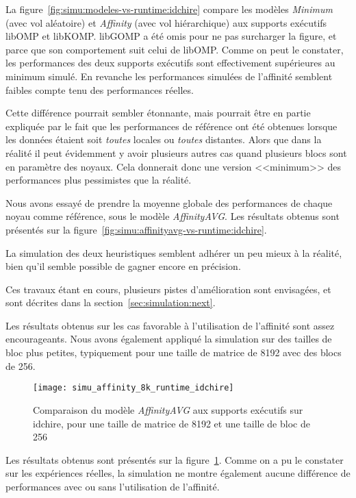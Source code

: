 La figure~\ref{fig:simu:modeles-vs-runtime:idchire} compare les modèles \emph{Minimum} (avec vol aléatoire) et \emph{Affinity} (avec vol hiérarchique) aux supports exécutifs libOMP et libKOMP. libGOMP a été omis pour ne pas surcharger la figure, et parce que son comportement suit celui de libOMP.
Comme on peut le constater, les performances des deux supports exécutifs sont effectivement supérieures au minimum simulé. En revanche les performances simulées de l'affinité semblent faibles compte tenu des performances réelles.

Cette différence pourrait sembler étonnante, mais pourrait être en partie expliquée par le fait que les performances de référence ont été obtenues lorsque les données étaient soit \textit{toutes} locales ou \textit{toutes} distantes.
Alors que dans la réalité il peut évidemment y avoir plusieurs autres cas quand plusieurs blocs sont en paramètre des noyaux.
Cela donnerait donc une version <<minimum>> des performances plus pessimistes que la réalité.

Nous avons essayé de prendre la moyenne globale des performances de chaque noyau comme référence, sous le modèle \emph{AffinityAVG}.
Les résultats obtenus sont présentés sur la figure~\ref{fig:simu:affinityavg-vs-runtime:idchire}.

La simulation des deux heuristiques semblent adhérer un peu mieux à la réalité, bien qu'il semble possible de gagner encore en précision.

Ces travaux étant en cours, plusieurs pistes d'amélioration sont envisagées, et sont décrites dans la section~\ref{sec:simulation:next}.


Les résultats obtenus sur les cas favorable à l'utilisation de l'affinité sont assez encourageants.
Nous avons également appliqué la simulation sur des tailles de bloc plus petites, typiquement pour une taille de matrice de 8192 avec des blocs de 256.

\begin{figure}[h!]
  \centering
  \texttt{[image: simu\_affinity\_8k\_runtime\_idchire]}
  \caption{Comparaison du modèle \emph{AffinityAVG} aux supports exécutifs sur idchire, pour une taille de matrice de 8192 et une taille de bloc de 256}\label{fig:simu:affinityavg-8k-vs-runtime:idchire}
\end{figure}

Les résultats obtenus sont présentés sur la figure~\ref{fig:simu:affinityavg-8k-vs-runtime:idchire}.
Comme on a pu le constater sur les expériences réelles, la simulation ne montre également aucune différence de performances avec ou sans l'utilisation de l'affinité.

